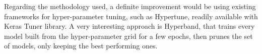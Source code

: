 
Regarding the methodology used, a definite improvement would be using existing
frameworks for hyper-parameter tuning, such as Hypertune, readily available
with Keras Tuner library. A very interesting approach is Hyperband, that trains
every model built from the hyper-parameter grid for a few epochs, then prunes
the set of models, only keeping the best performing ones.


